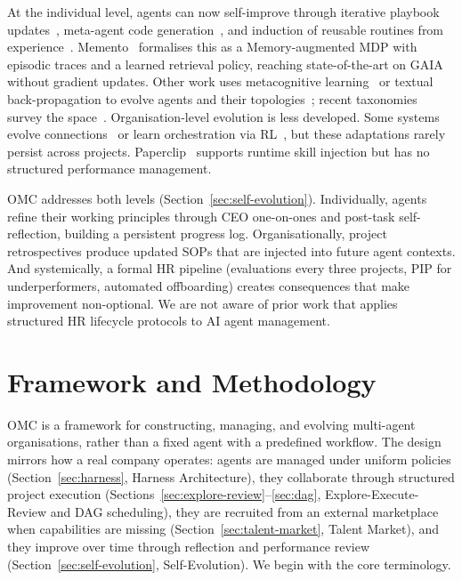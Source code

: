 \documentclass[11pt,a4paper]{article}
\begin{document}
At the individual level, agents can now self-improve through iterative playbook updates~\cite{zhang2026ace}, meta-agent code generation~\cite{hu2025adas}, and induction of reusable routines from experience~\cite{wang2025awm, xu2025agenttrek}. Memento~\cite{zhou2025memento} formalises this as a Memory-augmented MDP with episodic traces and a learned retrieval policy, reaching state-of-the-art on GAIA~\cite{mialon2023gaiabenchmarkgeneralai} without gradient updates. Other work uses metacognitive learning~\cite{metacognitive2025} or textual back-propagation to evolve agents and their topologies~\cite{hu2025evomac}; recent taxonomies survey the space~\cite{fang2025selfevosurvey, gao2025selfevosurvey}. Organisation-level evolution is less developed. Some systems evolve connections~\cite{hu2025evomac} or learn orchestration via RL~\cite{dang2025evolving}, but these adaptations rarely persist across projects. Paperclip~\cite{paperclip2025} supports runtime skill injection but has no structured performance management.

OMC addresses both levels (Section~\ref{sec:self-evolution}). Individually, agents refine their working principles through CEO one-on-ones and post-task self-reflection, building a persistent progress log. Organisationally, project retrospectives produce updated SOPs that are injected into future agent contexts. And systemically, a formal HR pipeline (evaluations every three projects, PIP for underperformers, automated offboarding) creates consequences that make improvement non-optional. We are not aware of prior work that applies structured HR lifecycle protocols to AI agent management.



\section{Framework and Methodology}
\label{sec:methodology}

OMC is a framework for constructing, managing, and evolving multi-agent organisations, rather than a fixed agent with a predefined workflow.
The design mirrors how a real company operates: agents are managed under uniform policies (Section~\ref{sec:harness}, Harness Architecture), they collaborate through structured project execution (Sections~\ref{sec:explore-review}--\ref{sec:dag}, Explore-Execute-Review and DAG scheduling), they are recruited from an external marketplace when capabilities are missing (Section~\ref{sec:talent-market}, Talent Market), and they improve over time through reflection and performance review (Section~\ref{sec:self-evolution}, Self-Evolution).  We begin with the core terminology.
\end{document}
